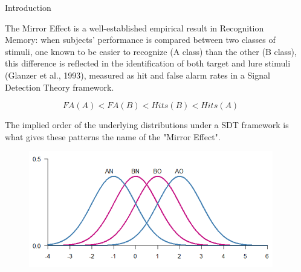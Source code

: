 \documentclass[final]{beamer}
\newlength{\sepwid}
\newlength{\onecolwid}
\begin{document}
\begin{frame}[t]

\begin{columns}[t] %
\begin{column}{\sepwid}\end{column} %
\begin{column}{\onecolwid} %

\begin{alertblock}{Introduction}

The Mirror Effect is a well-established empirical result in Recognition Memory: when  subjects' performance is compared between two classes of stimuli, one known to be easier to recognize (A class) than the other (B class), this difference is reflected in the identification of both target and lure stimuli (Glanzer et al., 1993), measured as hit and false alarm rates in a Signal Detection Theory framework.

\begin{equation}
FA(A) < FA(B) < Hits(B) < Hits(A)
\label{eqn:Rates}
\end{equation}

The  implied order of the underlying distributions under a SDT framework is what gives these patterns the name of the "Mirror Effect".
\begin{figure}
\includegraphics[width=0.5\linewidth]{Figures/MirrorEffect.png}
\end{figure}

\end{alertblock}




\end{column}
\end{columns}
\end{frame}
\end{document}
